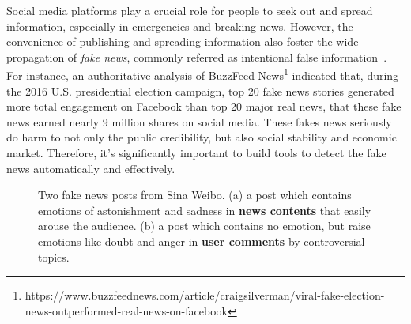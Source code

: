 \documentclass{article}
\newcommand{\kai}[1]{\textcolor{blue}{Kai: {#1}}}
\begin{document}
	Social media platforms play a crucial role for people to seek out and spread information, especially in emergencies and breaking news. However, the convenience of publishing and spreading information also foster the wide propagation of \textit{fake news}, commonly referred as intentional false information~\cite{shu2017fake}. %
	For instance,  an authoritative analysis of BuzzFeed News\footnote{https://www.buzzfeednews.com/article/craigsilverman/viral-fake-election-news-outperformed-real-news-on-facebook} indicated that, during the 2016 U.S. presidential election campaign, top 20 fake news stories generated more total engagement on Facebook than top 20 major real news, that these fake news earned nearly 9 million shares on social media. These fakes news seriously do harm to not only the public credibility, but also social stability and economic market. Therefore, it's significantly important to build tools to detect the fake news automatically and effectively. 
	
	\begin{figure}
		\centering
		\begin{minipage}[t]{0.22\textwidth}
		\end{minipage}
		\begin{minipage}[t]{0.23\textwidth}
		\end{minipage}
		\caption{Two fake news posts from Sina Weibo. (a) a post which contains emotions of astonishment and sadness in \textbf{news contents} that easily arouse the audience. (b) a post which contains no emotion, but raise emotions like doubt and anger in \textbf{user comments} by controversial topics.}
		\vspace{-0.3cm}
		\label{Fig:introcase}
	\end{figure}
	
\end{document}
